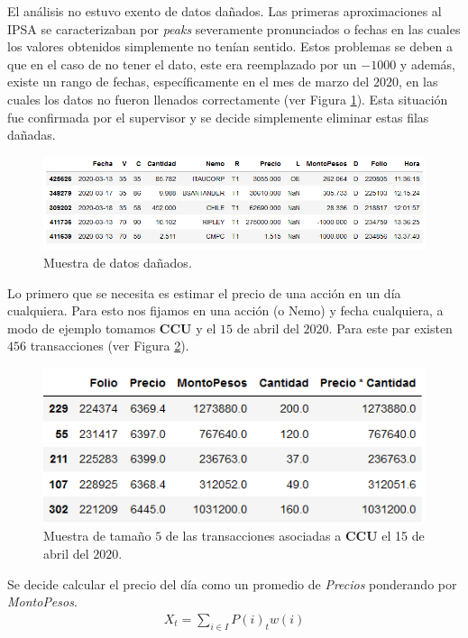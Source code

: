 \documentclass{article}
\begin{document}
   	\begin{remark}
   		El análisis no estuvo exento de datos dañados. Las primeras aproximaciones al IPSA se caracterizaban por \textit{peaks} severamente pronunciados o fechas en las cuales los valores obtenidos simplemente no tenían sentido. Estos problemas se deben a que en el caso de no tener el dato, este era reemplazado por un $-1000$ y además, existe un rango de fechas, específicamente en el mes de marzo del $2020$, en las cuales los datos no fueron llenados correctamente (ver Figura \ref{fig:danados}). Esta situación fue confirmada por el supervisor y se decide simplemente eliminar estas filas dañadas. 
   		
   		\begin{figure}[H]
   			\centering
   			\includegraphics[scale=.5]{imgs/muestra_danada.png}
   			\caption{Muestra de datos dañados.}
   			\label{fig:danados}
   		\end{figure}
   		
   	\end{remark}
   	
   	Lo primero que se necesita es estimar el precio de una acción en un día cualquiera. Para esto nos fijamos en una acción (o Nemo) y fecha cualquiera, a modo de ejemplo tomamos \textbf{CCU} y el $15$ de abril del $2020$. Para este par existen $456$ transacciones (ver Figura \ref{fig:ccu_abril}).   
   	\begin{figure}[H]
   		\centering
   		\includegraphics[scale=.5]{imgs/ccu_abril.png}
   		\caption{Muestra de tamaño $5$ de las transacciones asociadas a \textbf{CCU} el 15 de abril del $2020$.}
   		\label{fig:ccu_abril}
   	\end{figure}
   	Se decide calcular el precio del día como un promedio de \textit{Precios} ponderando por \textit{MontoPesos}.
    \begin{align*}
        X_t = \sum_{i\in I} P(i)_t w(i)
    \end{align*}
\end{document}
